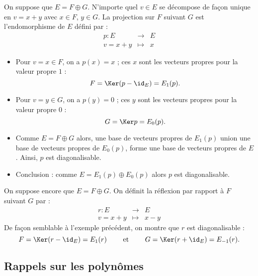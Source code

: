 \documentclass[12pt, class=report,crop=false]{standalone}
\begin{document}
\begin{exemple}[Projection]
On suppose que $E = F \oplus G$. N'importe quel $v \in E$ se décompose de façon unique en
 $v = x+y$ avec $x\in F$, $y\in G$.
La projection sur $F$ suivant $G$ est l'endomorphisme de $E$ défini par :
\[
\begin{array}{rcl}
p  : E & \longrightarrow & E \\
v = x + y & \longmapsto & x 
\end{array}
\]

\begin{itemize}
  \item 
Pour $v=x \in F$, on a $p(x)=x$ ; ces $x$ sont les vecteurs propres pour la valeur propre $1$ :
\[F = \Ker (p -\id_E) = E_1(p).\]

  \item 
Pour $v=y \in G$, on a $p(y) = 0$ ;  ces $y$ sont les vecteurs propres pour la valeur propre $0$ :
\[G = \Ker p = E_0(p).\]

  \item 
Comme $E = F \oplus G$ alors, une base de vecteurs propres de $E_1(p)$ union une base de vecteurs
propres de $E_0(p)$, forme une base de vecteurs propres de $E$. Ainsi, $p$ est diagonalisable.

  \item Conclusion : comme $E = E_1(p) \oplus E_0(p)$ alors $p$ est diagonalisable. 

\end{itemize}
\end{exemple}


\begin{exemple}[Réflexion]
On suppose encore que $E =F \oplus G$. On définit la réflexion par rapport à $F$ suivant $G$ par :
\[
\begin{array}{rcl}
r  : E & \longrightarrow & E \\
v = x + y & \longmapsto & x - y
\end{array}
\]
De façon semblable à l'exemple précédent, on montre que $r$ est diagonalisable :
\[F =\Ker (r-\id_E) = E_1(r) \qquad \text{ et } \qquad G = \Ker(r+\id_E) = E_{-1}(r) .\]

\end{exemple}



\subsection{Rappels sur les polynômes}
\end{document}
